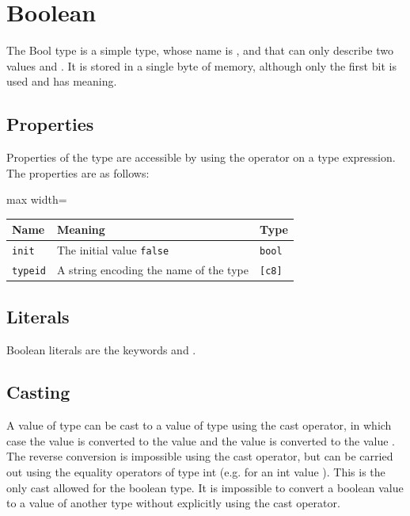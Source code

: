 \section{Boolean}
\label{sec:org9f3a743}

The Bool type is a simple type, whose name is , and that can only
describe two values  and . It is stored in a single
byte of memory, although only the first bit is used and has meaning.

\subsection{Properties}
\label{sec:org503bc9e}

Properties of the type  are accessible by using the operator
\token{::} on a type expression. The properties are as follows:

\begin{center}
  \begin{adjustbox}{max width=\linewidth}
    \begin{tabular}{|l|ll|}
      \hline
      Name & Meaning & Type\\[0pt]
      \hline
      \hline
      \texttt{init} & The initial value \texttt{false} & \texttt{bool}\\[0pt]
      \hline
      \texttt{typeid} & A string encoding the name of the type & \texttt{[c8]}\\[0pt]
      \hline
    \end{tabular}
  \end{adjustbox}
\end{center}

\subsection{Literals}
\label{sec:org7620b9c}

Boolean literals are the keywords  and .

\subsection{Casting}
\label{sec:org7cd1f94}

A value of type  can be cast to a value of type  using
the cast operator, in which case the value  is converted to the
value  and the value  is converted to the value
. The reverse conversion is impossible using the cast operator, but
can be carried out using the equality operators of type int (e.g.  for an int value ). This is the only cast allowed for the boolean type. It is impossible to
convert a boolean value to a value of another type without explicitly using the
cast operator.

